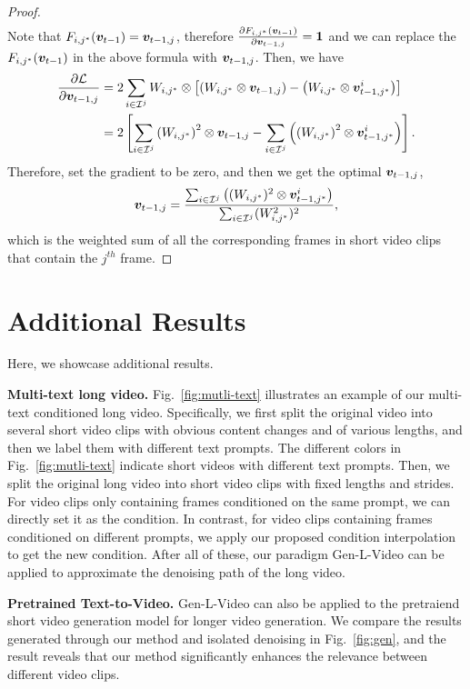 \documentclass{article}
\newtheorem{proof}{Proof}[section]
\begin{document}
\begin{proof}
\begin{align*}
\end{align*}
Note that $F_{i,j^*}({\bm{v}}_{t-1}) = {\bm{v}}_{t-1,j}$, therefore $\frac{\partial F_{i,j^*}({\bm{v}}_{t-1})}{\partial {\bm{v}}_{t-1,j}} = \boldsymbol 1$ and we can replace the  $F_{i,j^*}({\bm{v}}_{t-1})$ in the above formula with ${\bm{v}}_{t-1,j}$. Then, we have 
\begin{align*}
\frac{\partial {\mathcal{L}}}{\partial {\bm{v}}_{t-1,j}} & = 2 \sum_{i\in {\mathcal{I}}^j}W_{i,j^*}\otimes\left[  \left(W_{i,j^*} \otimes {\bm{v}}_{t-1,j}\right)-\left(W_{i,j^*} \otimes {\bm{v}}_{t-1,j^*}^i\right)\right] \\
& = 2 \left[ \sum_{i\in {\mathcal{I}}^j} \left(W_{i,j^*} \right)^2\otimes {\bm{v}}_{t-1,j}-\sum_{i\in {\mathcal{I}}^j}\left(\left(W_{i,j^*}\right)^2 \otimes {\bm{v}}_{t-1,j^*}^i\right)\right].
\end{align*}
Therefore, set the gradient to be zero, and then we get the optimal ${\bm{v}}_{t-1,j}$,
\begin{align*}
    {\bm{v}}_{t-1,j} = \frac{\sum_{i\in {\mathcal{I}}^j}\left((W_{i,j^*})^2 \otimes {\bm{v}}_{t-1,j^*}^i\right)}{\sum_{i\in {\mathcal{I}}^j} (W^2_{i,j^*})^2},
\end{align*}
which is the weighted sum of all the corresponding frames in short video clips that contain the $j^{th}$ frame.
\end{proof}

\section{Additional Results}\label{sec:addtional results}
Here, we showcase additional results. 

\noindent\textbf{Multi-text long video.} Fig.~\ref{fig:mutli-text} illustrates an example of our multi-text conditioned long video. Specifically, we first split the original video into several short video clips with obvious content changes and of various lengths, and then we label them with different text prompts. The different colors in Fig.~\ref{fig:mutli-text} indicate short videos with different text prompts. Then, we split the original long video into short video clips with fixed lengths and strides. For video clips only containing frames conditioned on the same prompt, we can directly set it as the condition. In contrast, for video clips containing frames conditioned on different prompts, we apply our proposed condition interpolation to get the new condition. After all of these, our paradigm Gen-L-Video can be applied to approximate the denoising path of the long video. 

\noindent\textbf{Pretrained Text-to-Video.} Gen-L-Video can also be applied to the pretraiend short video generation model for longer video generation. We compare the results generated through our method and isolated denoising in Fig.~\ref{fig:gen}, and the result reveals that our method significantly enhances the relevance between different video clips.
\end{document}
